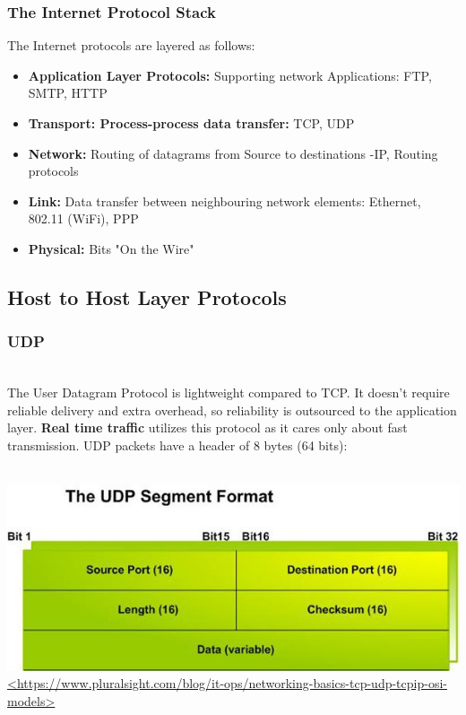 \documentclass{article}
\begin{document}
\subsubsection{The Internet Protocol Stack}
The Internet protocols are layered as follows:\\
\begin{itemize}
\item \textbf{Application Layer Protocols:} Supporting network Applications: FTP, SMTP, HTTP
\item \textbf{Transport: Process-process data transfer:} TCP, UDP
\item \textbf{Network:} Routing of datagrams from Source to destinations -IP, Routing protocols
\item \textbf{Link:} Data transfer between neighbouring network elements: Ethernet, 802.11 (WiFi), PPP
\item \textbf{Physical:} Bits "On the Wire"
\end{itemize}

\subsection{Host to Host Layer Protocols}
\subsubsection{UDP}\\
The User Datagram Protocol is lightweight compared to TCP. It doesn't require reliable delivery and extra overhead, so reliability is outsourced to the application layer. \textbf{Real time traffic} utilizes this protocol as it cares only about fast transmission. UDP packets have a header of 8 bytes (64 bits):\\\\
\begin{center}
\includegraphics[width=\textwidth]{UDP.jpg}\\
\url{<https://www.pluralsight.com/blog/it-ops/networking-basics-tcp-udp-tcpip-osi-models>}\\
\end{center}
\pagebreak
\end{document}
